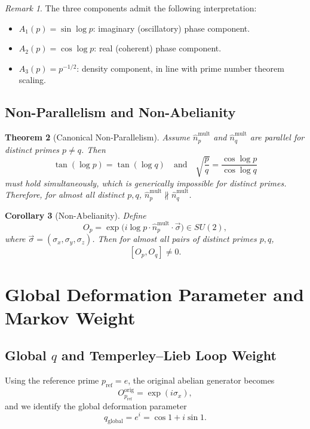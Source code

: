 \documentclass[11pt]{article}
\newtheorem{theorem}{Theorem}[section]
\newtheorem{corollary}[theorem]{Corollary}
\theoremstyle{remark}
\newtheorem{remark}[theorem]{Remark}
\begin{document}
\begin{remark}
The three components admit the following interpretation:
\begin{itemize}[nosep]
  \item $A_1(p)=\sin\log p$: imaginary (oscillatory) phase component.
  \item $A_2(p)=\cos\log p$: real (coherent) phase component.
  \item $A_3(p)=p^{-1/2}$: density component, in line with prime number theorem
        scaling.
\end{itemize}
\end{remark}

\subsection{Non-Parallelism and Non-Abelianity}

\begin{theorem}[Canonical Non-Parallelism]
Assume $\hat{n}_p^{\text{mult}}$ and $\hat{n}_q^{\text{mult}}$ are parallel for
distinct primes $p\neq q$. Then
\[
  \tan(\log p) = \tan(\log q)
  \quad\text{and}\quad
  \sqrt{\frac{p}{q}} = \frac{\cos\log p}{\cos\log q}
\]
must hold simultaneously, which is generically impossible for distinct primes.
Therefore, for almost all distinct $p,q$,
$\hat{n}_p^{\text{mult}} \not\parallel \hat{n}_q^{\text{mult}}$.
\end{theorem}

\begin{corollary}[Non-Abelianity]
Define
\[
  O_p = \exp\!\bigl(i \log p \cdot \hat{n}_p^{\text{mult}} \cdot \vec{\sigma}\bigr) 
  \in SU(2),
\]
where $\vec{\sigma}=(\sigma_x,\sigma_y,\sigma_z)$. Then for almost all pairs of
distinct primes $p,q$,
\[
  [O_p, O_q] \neq 0.
\]
\end{corollary}

\section{Global Deformation Parameter and Markov Weight}

\subsection{Global $q$ and Temperley--Lieb Loop Weight}

Using the reference prime $p_{\text{ref}}=e$, the original abelian generator
becomes
\[
  O_{p_{\text{ref}}}^{\text{orig}} = \exp(i \sigma_x),
\]
and we identify the global deformation parameter
\[
  q_{\text{global}} = e^{i} = \cos 1 + i \sin 1.
\]
\end{document}
